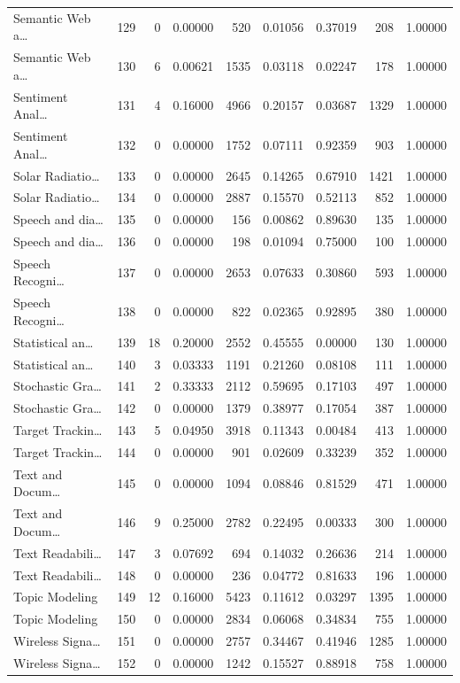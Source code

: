 \begin{table}
\begin{tabular}{lrrrrrrrr}
Semantic Web a… & 129 & 0 & 0.00000 & 520 & 0.01056 & 0.37019 & 208 & 1.00000 \\
Semantic Web a… & 130 & 6 & 0.00621 & 1535 & 0.03118 & 0.02247 & 178 & 1.00000 \\
Sentiment Anal… & 131 & 4 & 0.16000 & 4966 & 0.20157 & 0.03687 & 1329 & 1.00000 \\
Sentiment Anal… & 132 & 0 & 0.00000 & 1752 & 0.07111 & 0.92359 & 903 & 1.00000 \\
Solar Radiatio… & 133 & 0 & 0.00000 & 2645 & 0.14265 & 0.67910 & 1421 & 1.00000 \\
Solar Radiatio… & 134 & 0 & 0.00000 & 2887 & 0.15570 & 0.52113 & 852 & 1.00000 \\
Speech and dia… & 135 & 0 & 0.00000 & 156 & 0.00862 & 0.89630 & 135 & 1.00000 \\
Speech and dia… & 136 & 0 & 0.00000 & 198 & 0.01094 & 0.75000 & 100 & 1.00000 \\
Speech Recogni… & 137 & 0 & 0.00000 & 2653 & 0.07633 & 0.30860 & 593 & 1.00000 \\
Speech Recogni… & 138 & 0 & 0.00000 & 822 & 0.02365 & 0.92895 & 380 & 1.00000 \\
Statistical an… & 139 & 18 & 0.20000 & 2552 & 0.45555 & 0.00000 & 130 & 1.00000 \\
Statistical an… & 140 & 3 & 0.03333 & 1191 & 0.21260 & 0.08108 & 111 & 1.00000 \\
Stochastic Gra… & 141 & 2 & 0.33333 & 2112 & 0.59695 & 0.17103 & 497 & 1.00000 \\
Stochastic Gra… & 142 & 0 & 0.00000 & 1379 & 0.38977 & 0.17054 & 387 & 1.00000 \\
Target Trackin… & 143 & 5 & 0.04950 & 3918 & 0.11343 & 0.00484 & 413 & 1.00000 \\
Target Trackin… & 144 & 0 & 0.00000 & 901 & 0.02609 & 0.33239 & 352 & 1.00000 \\
Text and Docum… & 145 & 0 & 0.00000 & 1094 & 0.08846 & 0.81529 & 471 & 1.00000 \\
Text and Docum… & 146 & 9 & 0.25000 & 2782 & 0.22495 & 0.00333 & 300 & 1.00000 \\
Text Readabili… & 147 & 3 & 0.07692 & 694 & 0.14032 & 0.26636 & 214 & 1.00000 \\
Text Readabili… & 148 & 0 & 0.00000 & 236 & 0.04772 & 0.81633 & 196 & 1.00000 \\
Topic Modeling & 149 & 12 & 0.16000 & 5423 & 0.11612 & 0.03297 & 1395 & 1.00000 \\
Topic Modeling & 150 & 0 & 0.00000 & 2834 & 0.06068 & 0.34834 & 755 & 1.00000 \\
Wireless Signa… & 151 & 0 & 0.00000 & 2757 & 0.34467 & 0.41946 & 1285 & 1.00000 \\
Wireless Signa… & 152 & 0 & 0.00000 & 1242 & 0.15527 & 0.88918 & 758 & 1.00000 \\
\bottomrule
\end{tabular}
\end{table}
